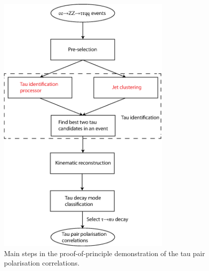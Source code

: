 \begin{figure}[htbp]
\centering %
  \includegraphics[width=0.75\textwidth]{tau/NoTimeAnalysis/tauNTAflow2}
  \caption{Main steps in the proof-of-principle demonstration of the tau pair polarisation correlations.}
  \label{fig:TauNTAflow}
\end{figure}





